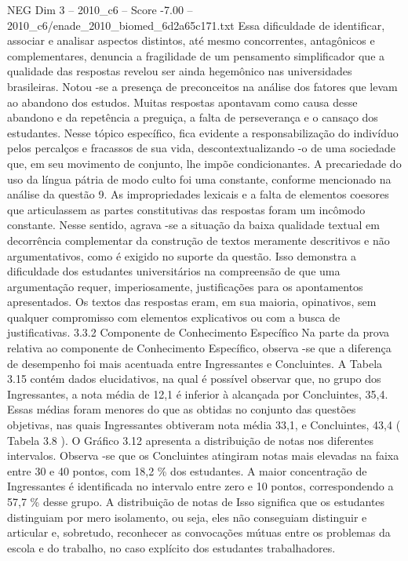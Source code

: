 \begin{textsample}{NEG Dim 3 – 2010\_c6 – Score -7.00 – 2010\_c6/enade\_2010\_biomed\_6d2a65c171.txt}
Essa dificuldade de identificar, associar e analisar aspectos distintos, até mesmo concorrentes, antagônicos e complementares, denuncia a fragilidade de um pensamento simplificador que a qualidade das respostas revelou ser ainda hegemônico nas universidades brasileiras.
Notou -se a presença de preconceitos na análise dos fatores que levam ao abandono dos estudos.
Muitas respostas apontavam como causa desse abandono e da repetência a preguiça, a falta de perseverança e o cansaço dos estudantes.
Nesse tópico específico, fica evidente a responsabilização do indivíduo pelos percalços e fracassos de sua vida, descontextualizando -o de uma sociedade que, em seu movimento de conjunto, lhe impõe condicionantes.
A precariedade do uso da língua pátria de modo culto foi uma constante, conforme mencionado na análise da questão 9.
As impropriedades lexicais e a falta de elementos coesores que articulassem as partes constitutivas das respostas foram um incômodo constante.
Nesse sentido, agrava -se a situação da baixa qualidade textual em decorrência complementar da construção de textos meramente descritivos e não argumentativos, como é exigido no suporte da questão.
Isso demonstra a dificuldade dos estudantes universitários na compreensão de que uma argumentação requer, imperiosamente, justificações para os apontamentos apresentados.
Os textos das respostas eram, em sua maioria, opinativos, sem qualquer compromisso com elementos explicativos ou com a busca de justificativas. 3.3.2 Componente de Conhecimento Específico Na parte da prova relativa ao componente de Conhecimento Específico, observa -se que a diferença de desempenho foi mais acentuada entre Ingressantes e Concluintes.
A Tabela 3.15 contém dados elucidativos, na qual é possível observar que, no grupo dos Ingressantes, a nota média de 12,1 é inferior à alcançada por Concluintes, 35,4.
Essas médias foram menores do que as obtidas no conjunto das questões objetivas, nas quais Ingressantes obtiveram nota média 33,1, e Concluintes, 43,4 ( Tabela 3.8 ).
O Gráfico 3.12 apresenta a distribuição de notas nos diferentes intervalos.
Observa -se que os Concluintes atingiram notas mais elevadas na faixa entre 30 e 40 pontos, com 18,2 \% dos estudantes.
A maior concentração de Ingressantes é identificada no intervalo entre zero e 10 pontos, correspondendo a 57,7 \% desse grupo.
A distribuição de notas de Isso significa que os estudantes distinguiam por mero isolamento, ou seja, eles não conseguiam distinguir e articular e, sobretudo, reconhecer as convocações mútuas entre os problemas da escola e do trabalho, no caso explícito dos estudantes trabalhadores.

\end{textsample}
